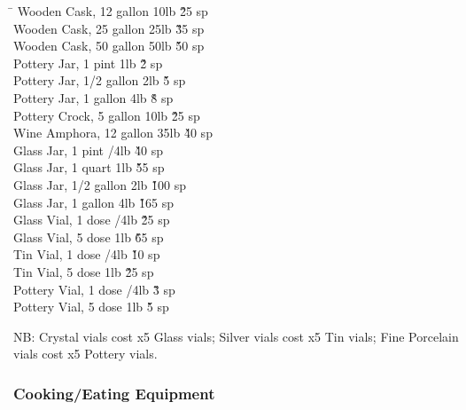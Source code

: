 \begin{multicols}{3}
{\begin{tabbing}
\hspace{0.8\linewidth}\= \kill
Wooden Cask, 12 gallon			\> 10lb			\' \` 25 sp \\
Wooden Cask, 25 gallon			\> 25lb			\' \` 35 sp \\
Wooden Cask, 50 gallon			\> 50lb			\' \` 50 sp \\
Pottery Jar, 1 pint			\> 1lb			\' \` 2 sp \\
Pottery Jar, 1/2 gallon			\> 2lb			\' \` 5 sp \\
Pottery Jar, 1 gallon			\> 4lb			\' \` 8 sp \\
Pottery Crock, 5 gallon			\> 10lb			\' \` 25 sp \\
Wine Amphora, 12 gallon			\> 35lb			\' \` 40 sp \\
Glass Jar, 1 pint			/4lb			\' \` 40 sp \\
Glass Jar, 1 quart			\> 1lb			\' \` 55 sp \\
Glass Jar, 1/2 gallon			\> 2lb			\' \` 100 sp \\
Glass Jar, 1 gallon			\> 4lb			\' \` 165 sp \\
Glass Vial, 1 dose			/4lb			\' \` 25 sp \\
Glass Vial, 5 dose			\> 1lb			\' \` 65 sp \\
Tin Vial, 1 dose			/4lb			\' \` 10 sp \\
Tin Vial, 5 dose			\> 1lb			\' \` 25 sp \\
Pottery Vial, 1 dose			/4lb			\' \` 3 sp \\
Pottery Vial, 5 dose			\> 1lb			\' \` 5 sp \\
\end{tabbing}

NB: Crystal vials cost x5 Glass vials; Silver vials cost x5 Tin vials;
Fine Porcelain vials cost x5 Pottery vials.

\subsubsection{Cooking/Eating Equipment}

}
\end{multicols}
